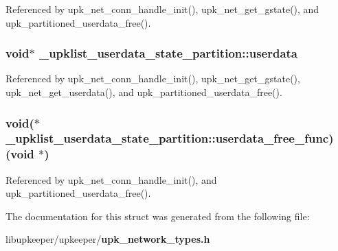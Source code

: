 Referenced by upk\_\-net\_\-conn\_\-handle\_\-init(), upk\_\-net\_\-get\_\-gstate(), and upk\_\-partitioned\_\-userdata\_\-free().

\subsubsection[{userdata}]{\setlength{\rightskip}{0pt plus 5cm}void$\ast$ {\bf \_\-upklist\_\-userdata\_\-state\_\-partition::userdata}}\label{struct__upklist__userdata__state__partition_a23bfda4fa1cc40680acf224b0904f719}


Referenced by upk\_\-net\_\-conn\_\-handle\_\-init(), upk\_\-net\_\-get\_\-gstate(), upk\_\-net\_\-get\_\-userdata(), and upk\_\-partitioned\_\-userdata\_\-free().

\subsubsection[{userdata\_\-free\_\-func}]{\setlength{\rightskip}{0pt plus 5cm}void($\ast$ {\bf \_\-upklist\_\-userdata\_\-state\_\-partition::userdata\_\-free\_\-func})(void $\ast$)}\label{struct__upklist__userdata__state__partition_aa8508108ec668d8779a2cb9d951a6328}


Referenced by upk\_\-net\_\-conn\_\-handle\_\-init(), and upk\_\-partitioned\_\-userdata\_\-free().



The documentation for this struct was generated from the following file:\begin{DoxyCompactItemize}
\item 
libupkeeper/upkeeper/{\bf upk\_\-network\_\-types.h}\end{DoxyCompactItemize}

